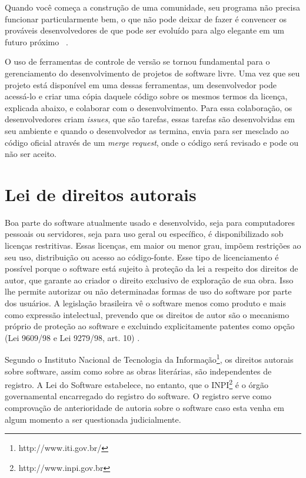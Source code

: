 Quando você começa a construção de uma comunidade, seu programa não precisa funcionar
particularmente bem, o que não pode deixar de fazer é convencer os prováveis 
desenvolvedores de que pode ser evoluído para algo elegante em um futuro próximo
~\cite{Raymond:1999:CB:580808}.

O uso de ferramentas de controle de versão se tornou fundamental para o gerenciamento
do desenvolvimento de projetos de software livre. Uma vez que seu projeto está 
disponível em uma dessas ferramentas, um desenvolvedor pode acessá-lo e criar
uma cópia daquele código sobre os mesmos termos da licença, explicada abaixo, e 
colaborar com o desenvolvimento. Para essa colaboração, os desenvolvedores criam
\textit{issues}, que são tarefas, essas tarefas são desenvolvidas em seu ambiente
e quando o desenvolvedor as termina, envia para ser mesclado ao código oficial através de um 
\textit{merge request}, onde o código será revisado e pode ou não ser aceito.


\section{Lei de direitos autorais}

Boa parte do software atualmente usado e desenvolvido, seja para computadores 
pessoais ou servidores, seja para uso geral ou específico, é disponibilizado sob
licenças restritivas. Essas licenças, em maior ou menor grau, impõem restrições 
ao seu uso, distribuição ou acesso ao código-fonte. Esse tipo de licenciamento é 
possível porque o software está sujeito à proteção da lei a respeito dos direitos 
de autor, que garante ao criador o direito exclusivo de exploração de sua obra. 
Isso lhe permite autorizar ou não determinadas formas de uso do software por parte 
dos usuários.
A legislação brasileira vê o software menos como produto e mais como expressão 
intelectual, prevendo que os direitos de autor são o mecanismo próprio de proteção 
ao software e excluindo explicitamente patentes como opção (Lei 9609/98 e Lei 9279/98, art. 10)
\cite{softwarepublico}.

Segundo o Instituto Nacional de Tecnologia da Informação\footnote{http://www.iti.gov.br/}, 
os direitos autorais sobre software, assim como sobre as obras literárias, são 
independentes de registro. A Lei do Software estabelece, no entanto, que o INPI\footnote{http://www.inpi.gov.br}
é o órgão governamental encarregado do registro do software. O registro serve 
como comprovação de anterioridade de autoria sobre o software caso esta venha 
em algum momento a ser questionada judicialmente.

